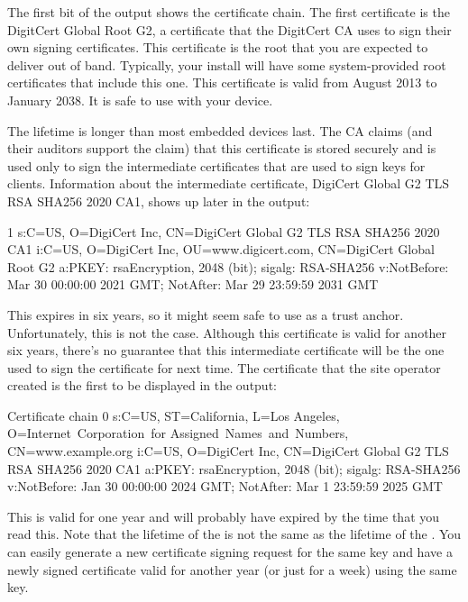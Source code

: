 {The first bit of the output shows the certificate chain.
The first certificate is the DigitCert Global Root G2, a certificate that the DigitCert CA uses to sign their own signing certificates.
This certificate is the root that you are expected to deliver out of band.
Typically, your  install will have some system-provided root certificates that include this one.
This certificate is valid from August 2013 to January 2038.
It is  safe to use with your device.

The lifetime is longer than most embedded devices last.
The CA claims (and their auditors support the claim) that this certificate is stored securely and is used only to sign the intermediate certificates that are used to sign keys for clients.
Information about the intermediate certificate, DigiCert Global G2 TLS RSA SHA256 2020 CA1, shows up later in the output:

\begin{console}
 1 s:C=US, O=DigiCert Inc, CN=DigiCert Global G2 TLS RSA SHA256 2020 CA1
   i:C=US, O=DigiCert Inc, OU=www.digicert.com, CN=DigiCert Global Root G2
   a:PKEY: rsaEncryption, 2048 (bit); sigalg: RSA-SHA256
   v:NotBefore: Mar 30 00:00:00 2021 GMT; NotAfter: Mar 29 23:59:59 2031 GMT
\end{console}

This expires in six years, so it might seem safe to use as a trust anchor.
Unfortunately, this is not the case.
Although this certificate is valid for another six years, there's no guarantee that this intermediate certificate will be the one used to sign the certificate for  next time.
The certificate that the site operator created is the first to be displayed in the output:

\begin{console}
Certificate chain
 0 s:C=US, ST=California, L=Los Angeles, O=Internet Corporation for
        Assigned Names and Numbers, CN=www.example.org
   i:C=US, O=DigiCert Inc, CN=DigiCert Global G2 TLS RSA SHA256 2020 CA1
   a:PKEY: rsaEncryption, 2048 (bit); sigalg: RSA-SHA256
   v:NotBefore: Jan 30 00:00:00 2024 GMT; NotAfter: Mar  1 23:59:59 2025 GMT
\end{console}

This is valid for one year and will probably have expired by the time that you read this.
Note that the lifetime of the  is not the same as the lifetime of the .
You can easily generate a new certificate signing request for the same key and have a newly signed certificate valid for another year (or just for a week) using the same key.

}
